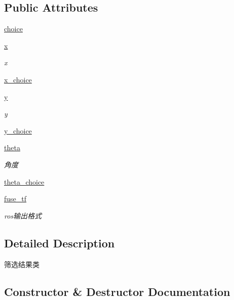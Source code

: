 \subsection*{Public Attributes}
\begin{DoxyCompactItemize}
\item 
\hyperlink{classselect___a__dox_1_1_s_e_l_e_c_t_e_d_a19d0142f34cf6a45a81360491c02574a}{choice}
\item 
\hyperlink{classselect___a__dox_1_1_s_e_l_e_c_t_e_d_a1c4ae522090af97ba4acbec134623509}{x}
\begin{DoxyCompactList}\small\item\em x \end{DoxyCompactList}\item 
\hyperlink{classselect___a__dox_1_1_s_e_l_e_c_t_e_d_aed00da86f9b91b7be14633361956c1a2}{x\+\_\+choice}
\item 
\hyperlink{classselect___a__dox_1_1_s_e_l_e_c_t_e_d_a91bd3c9d4a954d1881223ced9b05ee80}{y}
\begin{DoxyCompactList}\small\item\em y \end{DoxyCompactList}\item 
\hyperlink{classselect___a__dox_1_1_s_e_l_e_c_t_e_d_ac1eb56a4e49bf9e1c8419dfbedf2a8ba}{y\+\_\+choice}
\item 
\hyperlink{classselect___a__dox_1_1_s_e_l_e_c_t_e_d_a3399081a104b91dbb6fa59816e56e822}{theta}
\begin{DoxyCompactList}\small\item\em 角度 \end{DoxyCompactList}\item 
\hyperlink{classselect___a__dox_1_1_s_e_l_e_c_t_e_d_a2e78426c9fdbf5ae9163250a5c2e35a4}{theta\+\_\+choice}
\item 
\hyperlink{classselect___a__dox_1_1_s_e_l_e_c_t_e_d_a796a808c6aaa2b27acff79f12ee637d4}{fuse\+\_\+tf}
\begin{DoxyCompactList}\small\item\em ros输出格式 \end{DoxyCompactList}\end{DoxyCompactItemize}


\subsection{Detailed Description}
筛选结果类 



\subsection{Constructor \& Destructor Documentation}
\mbox{\label{classselect___a__dox_1_1_s_e_l_e_c_t_e_d_a90a6a0bd0f87fef2dbd12104f7eb2020}} 
